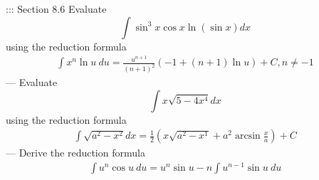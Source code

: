 ::: Section 8.6
Evaluate
\[\int\sin^3 x\cos x\ln(\sin x)dx\]
using the reduction formula
\begin{gather*}
\int x^n\ln u\ du=\frac{u^{n+1}}{(n+1)^2}(-1+(n+1)\ln u)+C,n\neq -1
\end{gather*}
---
Evaluate
\[\int x\sqrt{5-4x^4}dx\]
using the reduction formula
\begin{gather*}
\int\sqrt{a^2-x^2}dx=\frac{1}{2}\left(x\sqrt{a^2-x^1}+a^2\arcsin\frac{x}{a}\right)+C
\end{gather*}
---
Derive the reduction formula
\begin{gather*}
\int u^n\cos u\ du=u^n\sin u-n\int u^{n-1}\sin u\ du
\end{gather*}

